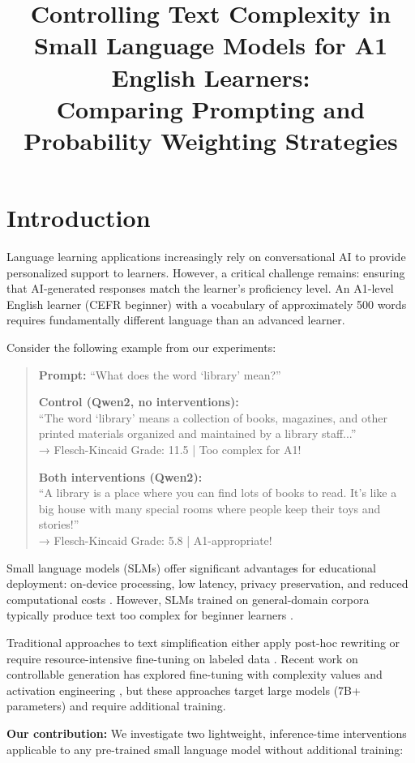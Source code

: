 \documentclass[10pt, a4paper]{article}
\title{Controlling Text Complexity in Small Language Models for A1 English Learners: \\ Comparing Prompting and Probability Weighting Strategies}
\begin{document}
\maketitleabstract

\section{Introduction}

Language learning applications increasingly rely on conversational AI to provide personalized support to learners. However, a critical challenge remains: ensuring that AI-generated responses match the learner's proficiency level. An A1-level English learner (CEFR beginner) with a vocabulary of approximately 500 words requires fundamentally different language than an advanced learner.

Consider the following example from our experiments:

\begin{quote}
\textbf{Prompt:} ``What does the word `library' mean?''

\textbf{Control (Qwen2, no interventions):} \\
``The word `library' means a collection of books, magazines, and other printed materials organized and maintained by a library staff...'' \\
→ Flesch-Kincaid Grade: 11.5 | Too complex for A1!

\textbf{Both interventions (Qwen2):} \\
``A library is a place where you can find lots of books to read. It's like a big house with many special rooms where people keep their toys and stories!'' \\
→ Flesch-Kincaid Grade: 5.8 | A1-appropriate!
\end{quote}

Small language models (SLMs) offer significant advantages for educational deployment: on-device processing, low latency, privacy preservation, and reduced computational costs \citep{TBD}. However, SLMs trained on general-domain corpora typically produce text too complex for beginner learners \citep{TBD}.

Traditional approaches to text simplification either apply post-hoc rewriting \citep{Gala2018,Crossley2011} or require resource-intensive fine-tuning on labeled data \citep{Al-Thanyyan2020,Baez2023}. Recent work on controllable generation has explored fine-tuning with complexity values \citep{Nguyen2024} and activation engineering \citep{Zhang2025}, but these approaches target large models (7B+ parameters) and require additional training.

\textbf{Our contribution:} We investigate two lightweight, inference-time interventions applicable to any pre-trained small language model without additional training:
\end{document}
